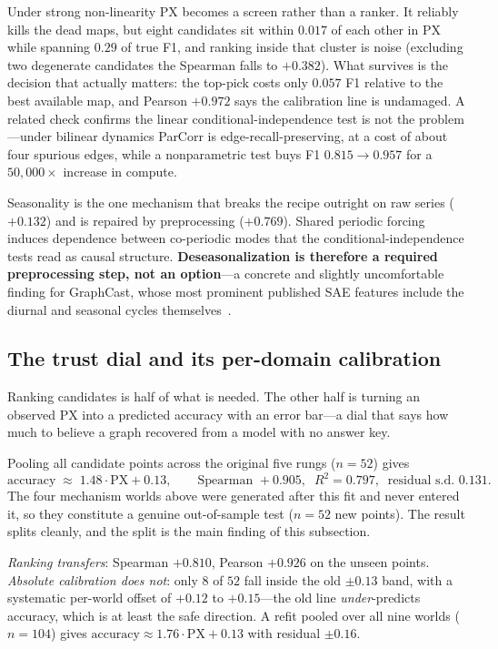 Under strong non-linearity PX becomes a screen rather than a ranker. It reliably
kills the dead maps, but eight candidates sit within $0.017$ of each other in PX
while spanning $0.29$ of true F1, and ranking inside that cluster is noise
(excluding two degenerate candidates the Spearman falls to $+0.382$). What
survives is the decision that actually matters: the top-pick costs only $0.057$ F1
relative to the best available map, and Pearson $+0.972$ says the calibration line
is undamaged. A related check confirms the linear conditional-independence test is
not the problem---under bilinear dynamics ParCorr is edge-recall-preserving, at a
cost of about four spurious edges, while a nonparametric test buys F1 $0.815 \to
0.957$ for a $50{,}000\times$ increase in compute.

Seasonality is the one mechanism that breaks the recipe outright on raw series
($+0.132$) and is repaired by preprocessing ($+0.769$). Shared periodic forcing
induces dependence between co-periodic modes that the conditional-independence
tests read as causal structure. \textbf{Deseasonalization is therefore a required
preprocessing step, not an option}---a concrete and slightly uncomfortable
finding for GraphCast, whose most prominent published SAE features include the
diurnal and seasonal cycles themselves~\cite{macmillan2025}.

\subsection{The trust dial and its per-domain calibration}
\label{sec:dial}

Ranking candidates is half of what is needed. The other half is turning an
observed PX into a predicted accuracy with an error bar---a dial that says how
much to believe a graph recovered from a model with no answer key.

Pooling all candidate points across the original five rungs ($n=52$) gives
\[
  \text{accuracy} \;\approx\; 1.48 \cdot \mathrm{PX} + 0.13,
  \qquad \text{Spearman } +0.905,\;\; R^2 = 0.797,\;\;
  \text{residual s.d.\ } 0.131 .
\]
The four mechanism worlds above were generated after this fit and never entered
it, so they constitute a genuine out-of-sample test ($n=52$ new points). The
result splits cleanly, and the split is the main finding of this subsection.

\emph{Ranking transfers}: Spearman $+0.810$, Pearson $+0.926$ on the unseen
points. \emph{Absolute calibration does not}: only $8$ of $52$ fall inside the old
$\pm 0.13$ band, with a systematic per-world offset of $+0.12$ to $+0.15$---the
old line \emph{under}-predicts accuracy, which is at least the safe direction. A
refit pooled over all nine worlds ($n=104$) gives
$\text{accuracy} \approx 1.76 \cdot \mathrm{PX} + 0.13$ with residual $\pm 0.16$.

